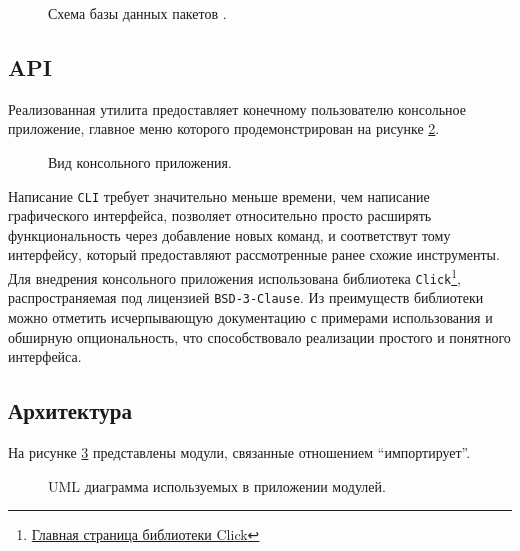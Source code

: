 \begin{figure}
	\centering
	
	\caption{Схема базы данных пакетов {\ubuntu}.}
	\label{bd:schema}
\end{figure}

\subsection{API}
Реализованная утилита предоставляет конечному пользователю консольное приложение, главное меню которого продемонстрирован на рисунке \ref{cli}.

\begin{figure}[ht]
	\centering
	
	\caption{Вид консольного приложения.}
	\label{cli}
\end{figure}

Написание \texttt{CLI} требует значительно меньше времени, чем написание графического интерфейса, позволяет относительно просто расширять функциональность через добавление новых команд, и соответствут тому интерфейсу, который предоставляют рассмотренные ранее схожие инструменты.
Для внедрения консольного приложения использована библиотека \texttt{Click}\footnote{\href{https://click.palletsprojects.com/en/8.1.x/}{Главная страница библиотеки Click}}, распространяемая под лицензией \texttt{BSD-3-Clause}.
Из преимуществ библиотеки можно отметить исчерпывающую документацию с примерами использования и обширную опциональность, что способствовало реализации простого и понятного интерфейса.

\subsection{Архитектура}
На рисунке \ref{uml:packages} представлены модули, связанные отношением \enquote{импортирует}.

\begin{figure}[ht]
	\centering
	
	\caption{UML диаграмма используемых в приложении модулей.}
	\label{uml:packages}
\end{figure}

